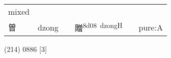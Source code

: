 \documentclass[14pt,a4paper]{scrartcl}
\begin{document}
\begin{longtable}[c]{@{}llllll@{}}
\begin{minipage}[t]{0.14\columnwidth}\raggedright\strut
mixed
\strut\end{minipage}\tabularnewline
\begin{minipage}[t]{0.14\columnwidth}\raggedright\strut
曽
\strut\end{minipage} &
\begin{minipage}[t]{0.14\columnwidth}\raggedright\strut
dzong
\strut\end{minipage} &
\begin{minipage}[t]{0.14\columnwidth}\raggedright\strut
\strut\end{minipage} &
\begin{minipage}[t]{0.14\columnwidth}\raggedright\strut
贈\textsuperscript{8d08~dzongH}
\strut\end{minipage} &
\begin{minipage}[t]{0.14\columnwidth}\raggedright\strut
\strut\end{minipage} &
\begin{minipage}[t]{0.14\columnwidth}\raggedright\strut
pure:A
\strut\end{minipage}\tabularnewline
\bottomrule
\end{longtable}

(214) 0886 {[}3{]}
\end{document}

